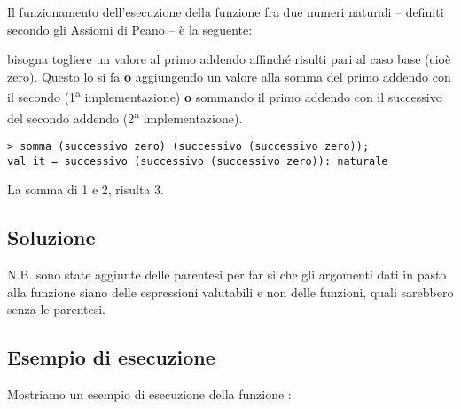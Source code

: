 \medskip
Il funzionamento dell'esecuzione della funzione  fra due numeri naturali -- definiti secondo gli Assiomi di Peano -- è la seguente:

\smallskip
bisogna togliere un valore  al primo addendo affinché risulti pari al caso base (cioè zero). %
Questo lo si fa \textbf{o} aggiungendo un valore  alla somma del primo addendo con il secondo (1\textsuperscript{a} implementazione) \textbf{o} sommando il primo addendo con il successivo del secondo addendo (2\textsuperscript{a} implementazione).
\begin{lstlisting}[style = SML, caption = {Esempio di esecuzione di \sml{somma}}]
> somma (successivo zero) (successivo (successivo zero));
val it = successivo (successivo (successivo zero)): naturale
\end{lstlisting}

La somma di 1 e 2, risulta 3.

\subsection{Soluzione}

N.B. sono state aggiunte delle parentesi per far sì che gli argomenti dati in pasto alla funzione  siano delle espressioni valutabili e non delle funzioni, quali sarebbero senza le parentesi.


\subsection{Esempio di esecuzione}

Mostriamo un esempio di esecuzione della funzione :

